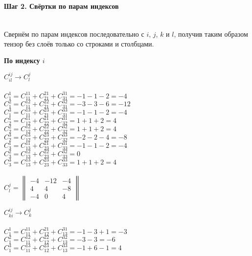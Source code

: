 \documentclass{article}
\begin{document}
\paragraph*{Шаг 2. Свёртки по парам индексов} \, \\
Свернём по парам индексов последовательно с $i$, $j$, $k$ и $l$, получив таким образом тензор без слоёв только со строками и столбцами.
\begin{center}
\textbf{По индексу $i$}
\end{center}
\begin{multicols}{2}
\begin{center}
$C^{ij}_{il} \rightarrow C^{j}_{l}$ \\ \, \\
$C^{1}_{1} = C^{11}_{11} + C^{21}_{21} + C^{31}_{31} = -1 -1 -2 = -4$ \\
$C^{2}_{1} = C^{12}_{11} + C^{22}_{21} + C^{32}_{31} = -3 -3 -6 = -12$ \\
$C^{3}_{1} = C^{13}_{11} + C^{23}_{21} + C^{33}_{31} = -1 -1 -2 = -4$ \\
$C^{1}_{2} = C^{11}_{12} + C^{21}_{22} + C^{31}_{32} = 1 +1 +2 = 4$ \\
$C^{2}_{2} = C^{12}_{12} + C^{22}_{22} + C^{32}_{32} = 1 +1 +2 = 4$ \\
$C^{3}_{2} = C^{13}_{12} + C^{23}_{22} + C^{33}_{32} = -2 -2 -4 = -8$ \\
$C^{1}_{3} = C^{11}_{13} + C^{21}_{23} + C^{31}_{33} = -1 -1 -2 = -4$ \\
$C^{2}_{3} = C^{12}_{13} + C^{22}_{23} + C^{32}_{33} = 0$ \\
$C^{3}_{3} = C^{13}_{13} + C^{23}_{23} + C^{33}_{33} = 1 +1 +2 = 4$ \\ \, \\
$C^{j}_{l} = \begin{Vmatrix}-4 & -12 & -4 \\ 4 & 4 & -8 \\ -4 & 0 & 4\end{Vmatrix}$
\end{center}
\begin{center}
$C^{ij}_{ki} \rightarrow C^{j}_{k}$ \\ \, \\
$C^{1}_{1} = C^{11}_{11} + C^{21}_{12} + C^{31}_{13} = -1 -3 +1 = -3$ \\
$C^{2}_{1} = C^{12}_{11} + C^{22}_{12} + C^{32}_{13} = -3 -3 = -6$ \\
$C^{3}_{1} = C^{13}_{11} + C^{23}_{12} + C^{33}_{13} = -1 +6 -1 = 4$ \\

\end{center}
\end{multicols}
\end{document}
